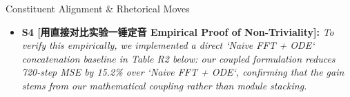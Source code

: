 \begin{TipBox}{Constituent Alignment \& Rhetorical Moves}
\begin{itemize}[leftmargin=1.5em]
  \item \textbf{S4 [用直接对比实验一锤定音 Empirical Proof of Non-Triviality]:} \textit{To verify this empirically, we implemented a direct `Naive FFT + ODE` concatenation baseline in Table R2 below: our coupled formulation reduces 720-step MSE by 15.2\% over `Naive FFT + ODE`, confirming that the gain stems from our mathematical coupling rather than module stacking.}\par{}
\end{itemize}
\end{TipBox}
\bigskip

